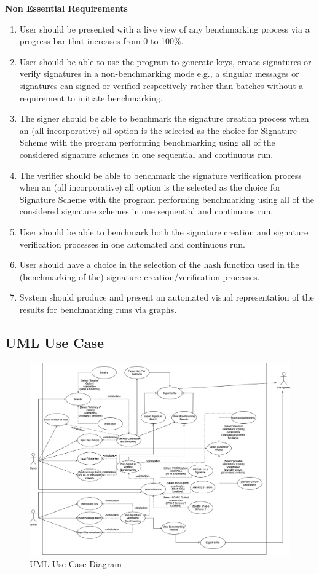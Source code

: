 \documentclass[]{final_report}
\theoremstyle{definition}
\begin{document}
\textbf{Non Essential Requirements}
\begin{enumerate}
\item User should be presented with a live view of any benchmarking process via a progress bar that increases from 0 to 100\%.
\item User should be able to use the program to generate keys, create signatures or verify signatures in a non-benchmarking mode e.g., a singular messages or signatures can signed or verified respectively rather than batches without a requirement to initiate benchmarking.
\item The signer should be able to benchmark the signature creation process when an (all incorporative) all option is the selected as the choice for Signature Scheme with the program performing benchmarking using all of the considered signature schemes in one sequential and continuous run.
\item The verifier should be able to benchmark the signature verification process when an (all incorporative) all option is the selected as the choice for Signature Scheme with the program performing benchmarking using all of the considered signature schemes in one sequential and continuous run.
\item User should be able to benchmark both the signature creation and signature verification processes in one automated and continuous run.
\item User should have a choice in the selection of the hash function used in the (benchmarking of the) signature creation/verification processes.
\item System should produce and present an automated visual representation of the results for benchmarking runs via graphs.
\end{enumerate}

\subsection{UML Use Case}
\begin{figure}[H]
    \centering
    \includegraphics[scale=0.38]{poc_pictures/MAIN_USE-CASE.png}
    \caption{UML Use Case Diagram}
    \label{fig:uc}
\end{figure}
\end{document}
